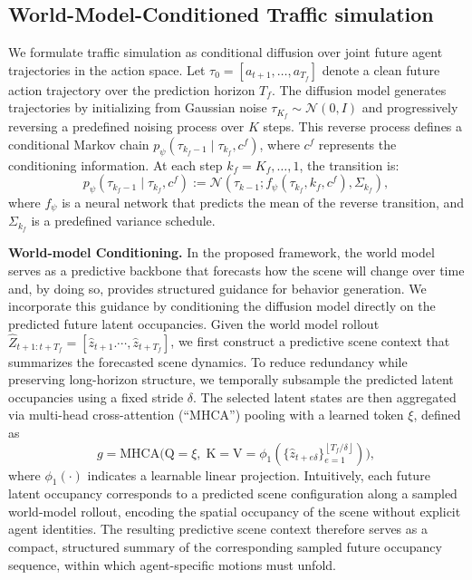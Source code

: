 \documentclass[runningheads]{llncs}
\begin{document}
\subsection{World-Model-Conditioned Traffic simulation} \label{Behavior_Generation}

We formulate traffic simulation as conditional diffusion over joint future agent trajectories in the action space. Let $\tau_0 = [a_{t+1}, \ldots, a_{T_f}]$ denote a clean future action trajectory over the prediction horizon $T_f$. The diffusion model generates trajectories by initializing from Gaussian noise $\tau_{K_f} \sim \mathcal{N}(0, I)$ and progressively reversing a predefined noising process over $K$ steps. This reverse process defines a conditional Markov chain $p_\psi(\tau_{k_f-1} \mid \tau_{k_f}, c^f)$, where $c^f$ represents the conditioning information. At each step $k_f = K_f, \ldots, 1$, the transition is:
\begin{equation*}
p_\psi\left(\tau_{{k_{f}}-1} \mid \tau_{k_{f}}, c^{f}\right):=\mathcal{N}\left(\tau_{k-1} ; f_\psi\left(\tau_{k_{f}}, {k_{f}}, c^f\right), \Sigma_{k_{f}}\right),
\end{equation*}
where $f_\psi$ is a neural network that predicts the mean of the reverse transition, and $\Sigma_{k_{f}}$ is a predefined variance schedule.

\textbf{World-model Conditioning.} 
In the proposed framework, the world model serves as a predictive backbone that forecasts how the scene will change over time and, by doing so, provides structured guidance for behavior generation. We incorporate this guidance by conditioning the diffusion model directly on the predicted future latent occupancies. Given the world model rollout $\hat{Z}_{t+1:t+T_f}=[\hat{z}_{t+1}. \cdots,\hat{z}_{t+T_f}]$, we first construct a predictive scene context that summarizes the forecasted scene dynamics. To reduce redundancy while preserving long-horizon structure, we temporally subsample the predicted latent occupancies using a fixed stride $\delta$. The selected latent states are then aggregated via multi-head cross-attention (``MHCA'') pooling with a learned token $\xi$, defined as
\begin{equation*}
g
=
\mathrm{MHCA}
\big(
\mathrm{Q}=\xi,\;
\mathrm{K}=\mathrm{V}=
\phi_1(
\{\hat{z}_{t+e\delta}\}_{e=1}^{\left\lfloor T_f/\delta \right\rfloor}
)
\big),
\end{equation*}
where $\phi_1(\cdot)$ indicates a learnable linear projection. Intuitively, each future latent occupancy corresponds to a predicted scene configuration along a sampled world-model rollout, encoding the spatial occupancy of the scene without explicit agent identities. The resulting predictive scene context therefore serves as a compact, structured summary of the corresponding sampled future occupancy sequence, within which agent-specific motions must unfold.
\end{document}
